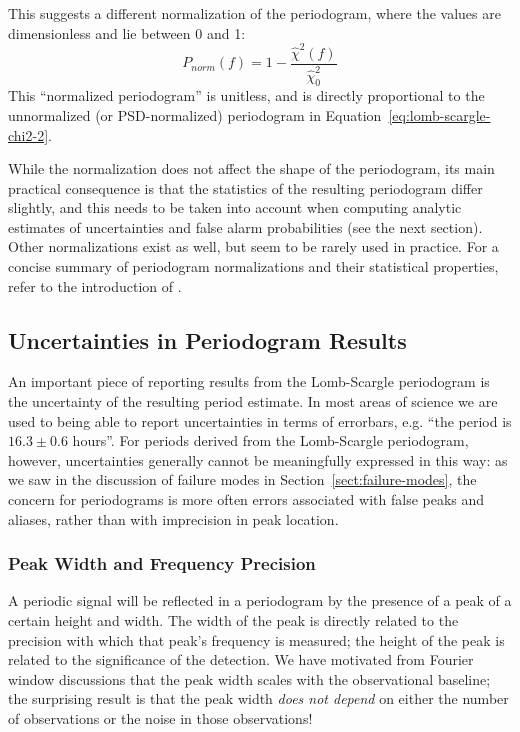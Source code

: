 \documentclass[preprint]{aastex}
\newcommand{\Eq}[1]{Equation~\ref{eq:#1}}
\newcommand{\eq}[1]{\Eq{#1}}
\newcommand{\eqlabel}[1]{\label{eq:#1}}
\newcommand{\Sect}[1]{Section~\ref{sect:#1}}
\newcommand{\sect}[1]{\Sect{#1}}
\newcommand{\sectlabel}[1]{\label{sect:#1}}
\begin{document}
This suggests a different normalization of the periodogram, where the values
are dimensionless and lie between 0 and 1:
\begin{equation}
  P_{norm}(f) = 1 - \frac{\hat{\chi}^2(f)}{\hat{\chi}^2_0}
  \eqlabel{lomb-scargle-normalized}
\end{equation}
This ``normalized periodogram'' is unitless, and
is directly proportional to the unnormalized
(or PSD-normalized) periodogram in \eq{lomb-scargle-chi2-2}.

While the normalization does not affect the shape of the periodogram,
its main practical consequence is that the statistics of the resulting
periodogram differ slightly, and this needs to be taken into account when
computing analytic estimates of uncertainties and false alarm probabilities
(see the next section).
Other normalizations exist as well, but seem to be rarely used in practice.
For a concise summary of periodogram normalizations and their statistical
properties, refer to the introduction of \citet{Baluev2008}.

\subsection{Uncertainties in Periodogram Results}
\sectlabel{uncertainties}
An important piece of reporting results from the Lomb-Scargle periodogram is
the uncertainty of the resulting period estimate.
In most areas of science we are used to being able to report uncertainties in
terms of errorbars, {e.g.} ``the period is $16.3 \pm 0.6$ hours''.
For periods derived from the Lomb-Scargle periodogram, however, uncertainties
generally cannot be meaningfully expressed in this way:
as we saw in the discussion of failure modes in \sect{failure-modes},
the concern for periodograms is more often errors associated with
false peaks and aliases, rather than with imprecision in peak location.

\subsubsection{Peak Width and Frequency Precision}

A periodic signal will be reflected in a periodogram by the presence of a
peak of a certain height and width.
The width of the peak is directly related to the precision with which that
peak's frequency is measured; the height of the peak 
is related to the significance of the detection.
We have motivated from Fourier window discussions that the peak width scales
with the observational baseline; the surprising result is that the peak width
{\it does not depend} on either the number of observations or the noise
in those observations!
\end{document}

